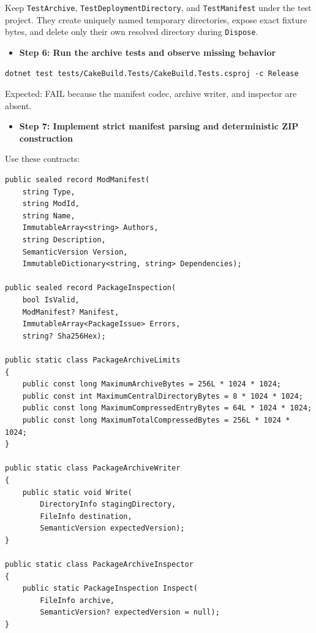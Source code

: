 \documentclass[
  10pt,
  letterpaper,
]{article}
\newcommand{\passthrough}[1]{#1}
\providecommand{\tightlist}{%
  \setlength{\itemsep}{0pt}\setlength{\parskip}{0pt}}
\begin{document}
Keep \passthrough{\lstinline!TestArchive!},
\passthrough{\lstinline!TestDeploymentDirectory!}, and
\passthrough{\lstinline!TestManifest!} under the test project. They
create uniquely named temporary directories, expose exact fixture bytes,
and delete only their own resolved directory during
\passthrough{\lstinline!Dispose!}.

\begin{itemize}
\tightlist
\item[$\square$]
  \textbf{Step 6: Run the archive tests and observe missing behavior}
\end{itemize}

\begin{lstlisting}
dotnet test tests/CakeBuild.Tests/CakeBuild.Tests.csproj -c Release
\end{lstlisting}

Expected: FAIL because the manifest codec, archive writer, and inspector
are absent.

\begin{itemize}
\tightlist
\item[$\square$]
  \textbf{Step 7: Implement strict manifest parsing and deterministic
  ZIP construction}
\end{itemize}

Use these contracts:

\begin{lstlisting}
public sealed record ModManifest(
    string Type,
    string ModId,
    string Name,
    ImmutableArray<string> Authors,
    string Description,
    SemanticVersion Version,
    ImmutableDictionary<string, string> Dependencies);

public sealed record PackageInspection(
    bool IsValid,
    ModManifest? Manifest,
    ImmutableArray<PackageIssue> Errors,
    string? Sha256Hex);

public static class PackageArchiveLimits
{
    public const long MaximumArchiveBytes = 256L * 1024 * 1024;
    public const int MaximumCentralDirectoryBytes = 8 * 1024 * 1024;
    public const long MaximumCompressedEntryBytes = 64L * 1024 * 1024;
    public const long MaximumTotalCompressedBytes = 256L * 1024 * 1024;
}

public static class PackageArchiveWriter
{
    public static void Write(
        DirectoryInfo stagingDirectory,
        FileInfo destination,
        SemanticVersion expectedVersion);
}

public static class PackageArchiveInspector
{
    public static PackageInspection Inspect(
        FileInfo archive,
        SemanticVersion? expectedVersion = null);
}
\end{lstlisting}
\end{document}
